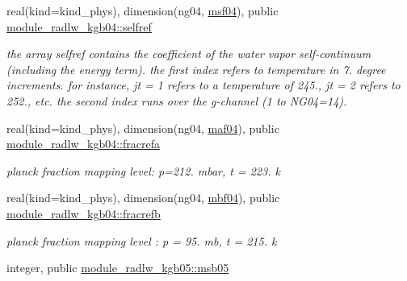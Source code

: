 \begin{DoxyCompactItemize}
\mbox{\label{group__module__radlw__kgbnn_ga696b91ef86ccbda17df10f770797cafa}} 
real(kind=kind\+\_\+phys), dimension(ng04, \hyperlink{group__module__radlw__kgbnn_ga4b38dd1165aca80e19697df7ae74a27a}{msf04}), public \hyperlink{group__module__radlw__kgbnn_ga696b91ef86ccbda17df10f770797cafa}{module\+\_\+radlw\+\_\+kgb04\+::selfref}
\begin{DoxyCompactList}\small\item\em the array selfref contains the coefficient of the water vapor self-\/continuum (including the energy term). the first index refers to temperature in 7. degree increments. for instance, jt = 1 refers to a temperature of 245., jt = 2 refers to 252., etc. the second index runs over the g-\/channel (1 to N\+G04=14). \end{DoxyCompactList}\item 
\mbox{\label{group__module__radlw__kgbnn_gace1d87742e2c543d9b0662e1c7d2b624}} 
real(kind=kind\+\_\+phys), dimension(ng04, \hyperlink{group__module__radlw__kgbnn_ga60ff35def4e526c7d9cf3ec88bdd4485}{maf04}), public \hyperlink{group__module__radlw__kgbnn_gace1d87742e2c543d9b0662e1c7d2b624}{module\+\_\+radlw\+\_\+kgb04\+::fracrefa}
\begin{DoxyCompactList}\small\item\em planck fraction mapping level\+: p=212. mbar, t = 223. k \end{DoxyCompactList}\item 
\mbox{\label{group__module__radlw__kgbnn_gae8d5d56d09dfbe06d918c6b098e3fddf}} 
real(kind=kind\+\_\+phys), dimension(ng04, \hyperlink{group__module__radlw__kgbnn_ga768f4447809fb11206dce383a121d595}{mbf04}), public \hyperlink{group__module__radlw__kgbnn_gae8d5d56d09dfbe06d918c6b098e3fddf}{module\+\_\+radlw\+\_\+kgb04\+::fracrefb}
\begin{DoxyCompactList}\small\item\em planck fraction mapping level \+: p = 95. mb, t = 215. k \end{DoxyCompactList}\item 
\mbox{\label{group__module__radlw__kgbnn_ga0f3b6573bfe94c5a5968cda2dc8b1adf}} 
integer, public \hyperlink{group__module__radlw__kgbnn_ga0f3b6573bfe94c5a5968cda2dc8b1adf}{module\+\_\+radlw\+\_\+kgb05\+::msb05}

\end{DoxyCompactItemize}
